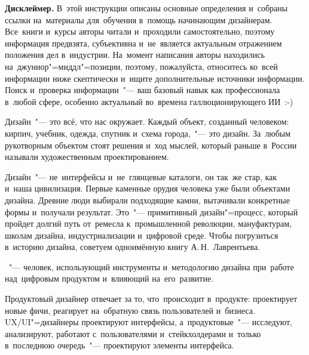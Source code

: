 


\textbf{Дисклеймер.} В~этой инструкции описаны основные определения
и~собраны ссылки на~материалы для~обучения в~помощь начинающим
дизайнерам. Все~книги и~курсы авторы читали и~проходили
самостоятельно, поэтому информация предвзята, субъективна
и~не~является актуальным отражением положения дел в~индустрии.
На~момент написания авторы находились на~джуниор"=миддл"=позиции,
поэтому, пожалуйста, относитесь ко~всей информации ниже скептически
и~ищите дополнительные источники информации. Поиск и~проверка
информации~"--- ваш базовый навык как профессионала в~любой сфере,
особенно актуальный во~времена галлюционирующего ИИ~:-)

Дизайн~"--- это всё, что нас окружает. Каждый объект, созданный
человеком: кирпич, учебник, одежда, спутник и~схема города,~"--- это
дизайн. За~любым рукотворным объектом стоят решения и~ход мыслей,
который раньше в~России называли художественным проектированием. 

Дизайн~"--- не~интерфейсы и~не~глянцевые каталоги, он так~же стар,
как и~наша цивилизация. Первые каменные орудия человека уже были
объектами дизайна. Древние люди выбирали подходящие камни,
вытачивали конкретные формы и~получали результат. Это~"---
примитивный дизайн"=процесс, который пройдет долгий путь от~ремесла
к~промышленной революции, мануфактурам, школам дизайна,
индустриализации и~цифровой среде. Чтобы погрузиться в~историю
дизайна, советуем одноимённую книгу А.\,Н.~Лаврентьева.

\begin{definition}
	~"--- человек, использующий инструменты
	и~методологию дизайна при~работе над~цифровым продуктом и~влияющий
	на~его~развитие. 
\end{definition}


Продуктовый дизайнер отвечает за то, что~происходит в~продукте:
проектирует новые фичи, реагирует на~обратную связь пользователей
и~бизнеса. UX/UI"=дизайнеры проектируют интерфейсы,
а~продуктовые~"--- исследуют, анализируют, работают с~пользователями
и~стейкхолдерами и~только в~последнюю очередь~"--- проектируют
элементы интерфейса. 

